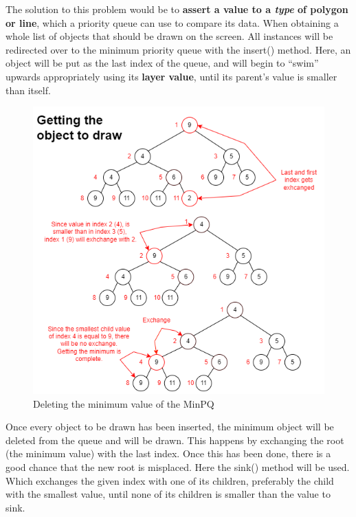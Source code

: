 The solution to this problem would be to \textbf{assert a value to a \textit{type} of polygon or line}, which a priority queue can use to compare its data. When obtaining a whole list of objects that should be drawn on the screen. All instances will be redirected over to the minimum priority queue with the insert() method. Here, an object will be put as the last index of the queue, and will begin to “swim” upwards appropriately using its \textbf{layer value}, until its parent’s value is smaller than itself. 

\begin{figure}
\includegraphics[width=0.8\linewidth]{docs/material/RemoveMin.png} 
\caption{Deleting the minimum value of the MinPQ}\label{PQ/remove}
\label{fig:wrapfig}
\end{figure}
Once every object to be drawn has been inserted, the minimum object will be deleted from the queue and will be drawn. This happens by exchanging the root (the minimum value) with the last index. Once this has been done, there is a good chance that the new root is misplaced. Here the sink() method will be used. Which exchanges the given index with one of its children, preferably the child with the smallest value, until none of its children is smaller than the value to sink.
\newpage
\noindent
